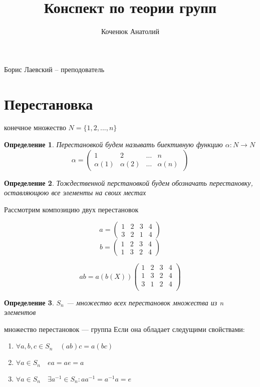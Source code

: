 \documentclass[11pt,a4paper]{book}
\author{Коченюк Анатолий}
\title{Конспект по теории групп}
\newtheorem{Def}{Определение}[chapter]
\begin{document}
\maketitle
Борис Лаевский -- преподователь

\section{Перестановка}
конечное множество $N = \{1, 2, ..., n\}$

\begin{Def}
Перестановкой будем называть биективную функцию 
$
\alpha: N \to N
$
$$
\alpha = 
\begin{pmatrix}
1 & 2 &\hdots& n\\
\alpha(1) & \alpha(2)& \hdots & \alpha(n)
\
\end{pmatrix}
$$
\end{Def}

\begin{Def}
Тождественной перстановкой будем обозначать перестановку, оставляющюю все элементы на своих местах
\end{Def} 

Рассмотрим композицию двух перестановок 

$$
a = 
\begin{pmatrix}
1 & 2 & 3 & 4\\
3 & 2 & 1 & 4
\end{pmatrix}
$$
$$
b = 
\begin{pmatrix}
1 & 2 & 3 & 4\\
1 & 3 & 2 & 4
\end{pmatrix}
$$

$$
ab = a(b(X))
\begin{pmatrix}
1 & 2 & 3 & 4\\
1 & 3 & 2 & 4\\
3 & 1 & 2 & 4\\
\end{pmatrix}
$$

\begin{Def}
$S_n $ --- множество всех перестановок множества из n элементов
\end{Def}
множество перестановок --- группа Если она обладает следущими свойствами:
\begin{enumerate}
	\item $\forall a, b, c \in S_n \quad (ab)c = a(bc)$
	\item $\forall a \in S_n \quad ea = ae = a$
	\item $\forall a \in S_n \quad \exists a^{-1} \in S_n: aa^{-1} = a^{-1}a = e$
\end{enumerate}
\end{document}
